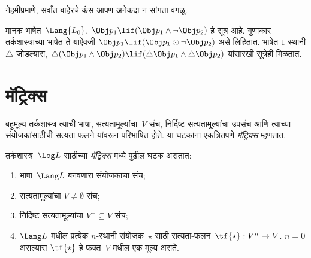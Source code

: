 नेहमीप्रमाणे, सर्वांत बाहेरचे कंस आपण अनेकदा न सांगता वगळू.

\begin{ex}
  मानक भाषेत~$\Lang{L_0}$,
  $\Obj p_1 \lif (\Obj p_1 \land \lnot \Obj p_2)$ हे सूत्र आहे.
  गुणाकार तर्कशास्त्राच्या भाषेत ते याऐवजी
  $\Obj p_1 \lif (\Obj p_1 \odot \lnot \Obj p_2)$ असे लिहितात.
  भाषेत $1$-स्थानी $\triangle$ जोडल्यास,
  $\triangle (\Obj p_1 \land \Obj p_2) \lif (\triangle \Obj p_1 \land \triangle \Obj p_2)$
  यांसारखी सूत्रेही मिळतात.
\end{ex}












\section{मॅट्रिक्स}\label{mvl:syn:mat:sec}

बहुमूल्य तर्कशास्त्र त्याची भाषा, सत्यतामूल्यांचा~$V$ संच,
निर्दिष्ट सत्यतामूल्यांचा उपसंच आणि त्याच्या संयोजकांसाठीची
सत्यता-फलने यांवरून परिभाषित होते. या घटकांना एकत्रितपणे
\emph{मॅट्रिक्स} म्हणतात.

\begin{defn}[मॅट्रिक्स]
\label{mvl:syn:mat:defn:matrix}
तर्कशास्त्र~$\Log L$ साठीच्या \emph{मॅट्रिक्स} मध्ये पुढील घटक असतात:
\begin{enumerate}
\item भाषा~$\Lang L$ बनवणारा संयोजकांचा संच;
\item सत्यतामूल्यांचा $V \neq \emptyset$ संच;
\item निर्दिष्ट सत्यतामूल्यांचा $V^+ \subseteq V$ संच;
\item $\Lang L$ मधील प्रत्येक $n$-स्थानी संयोजक~$\star$ साठी
  सत्यता-फलन~$\tf{\star} : V^n \to V$. $n = 0$ असल्यास
  $\tf{\star}$ हे फक्त~$V$ मधील एक मूल्य असते.
\end{enumerate}
\end{defn}

